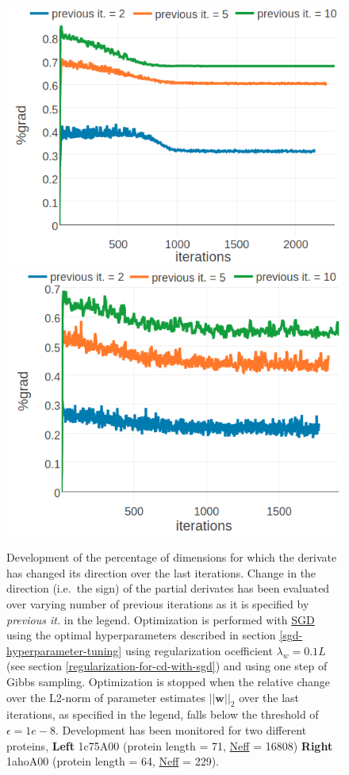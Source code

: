 \documentclass[11pt,a4paper,twoside]{book}
\newcommand{\eq}{\!=\!}
\newcommand{\w}{\mathbf{w}}
\theoremstyle{definition}
\theoremstyle{definition}
\theoremstyle{remark}
\begin{document}
\begin{figure}

{\centering \includegraphics[width=0.48\linewidth]{img/full_likelihood/sgd/percentage_changes_in_gradient_direction_1c75A00} \includegraphics[width=0.48\linewidth]{img/full_likelihood/sgd/percentage_changes_in_gradient_direction_1ahoA00} 

}

\caption{Development of the percentage of
dimensions for which the derivate has changed its direction over the
last iterations. Change in the direction (i.e.~the sign) of the partial
derivates has been evaluated over varying number of previous iterations
as it is specified by \emph{previous it.} in the legend. Optimization is
performed with \protect\hyperlink{abbrev}{SGD} using the optimal
hyperparameters described in section \ref{sgd-hyperparameter-tuning}
using regularization ocefficient \(\lambda_w \eq 0.1L\) (see section
\ref{regularization-for-cd-with-sgd}) and using one step of Gibbs
sampling. Optimization is stopped when the relative change over the
L2-norm of parameter estimates \(||\w||_2\) over the last iterations, as
specified in the legend, falls below the threshold of
\(\epsilon = 1e-8\). Development has been monitored for two different
proteins, \textbf{Left} 1c75A00 (protein length = 71,
\protect\hyperlink{abbrev}{Neff} = 16808) \textbf{Right} 1ahoA00
(protein length = 64, \protect\hyperlink{abbrev}{Neff} = 229).}\label{fig:gradient-directions}
\end{figure}
\end{document}
